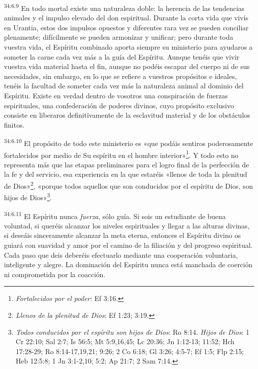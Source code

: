 \par
\textsuperscript{34:6.9} En todo mortal existe una naturaleza doble: la herencia de las tendencias animales y el impulso elevado del don espiritual. Durante la corta vida que vivís en Urantia, estos dos impulsos opuestos y diferentes rara vez se pueden conciliar plenamente; difícilmente se pueden armonizar y unificar; pero durante toda vuestra vida, el Espíritu combinado aporta siempre su ministerio para ayudaros a someter la carne cada vez más a la guía del Espíritu. Aunque tenéis que vivir vuestra vida material hasta el fin, aunque no podéis escapar del cuerpo ni de sus necesidades, sin embargo, en lo que se refiere a vuestros propósitos e ideales, tenéis la facultad de someter cada vez más la naturaleza animal al dominio del Espíritu. Existe en verdad dentro de vosotros una conspiración de fuerzas espirituales, una confederación de poderes divinos, cuyo propósito exclusivo consiste en liberaros definitivamente de la esclavitud material y de los obstáculos finitos.

\par
\textsuperscript{34:6.10} El propósito de todo este ministerio es «que podáis sentiros poderosamente fortalecidos por medio de Su espíritu en el hombre interior»\footnote{\textit{Fortalecidos por el poder}: Ef 3:16.}. Y todo esto no representa más que las etapas preliminares para el logro final de la perfección de la fe y del servicio, esa experiencia en la que estaréis «llenos de toda la plenitud de Dios»\footnote{\textit{Llenos de la plenitud de Dios}: Ef 1:23; 3:19.}, «porque todos aquellos que son conducidos por el espíritu de Dios, son hijos de Dios»\footnote{\textit{Todos conducidos por el espíritu son hijos de Dios}: Ro 8:14. \textit{Hijos de Dios}: 1 Cr 22:10; Sal 2:7; Is 56:5; Mt 5:9,16,45; Lc 20:36; Jn 1:12-13; 11:52; Hch 17:28-29; Ro 8:14-17,19,21; 9:26; 2 Co 6:18; Gl 3:26; 4:5-7; Ef 1:5; Flp 2:15; Heb 12:5:8; 1 Jn 3:1-2,10; 5:2; Ap 21:7; 2 Sam 7:14.}.

\par
\textsuperscript{34:6.11} El Espíritu nunca \textit{fuerza}, sólo guía. Si sois un estudiante de buena voluntad, si queréis alcanzar los niveles espirituales y llegar a las alturas divinas, si deseáis sinceramente alcanzar la meta eterna, entonces el Espíritu divino os guiará con suavidad y amor por el camino de la filiación y del progreso espiritual. Cada paso que deis deberéis efectuarlo mediante una cooperación voluntaria, inteligente y alegre. La dominación del Espíritu nunca está manchada de coerción ni comprometida por la coacción.

